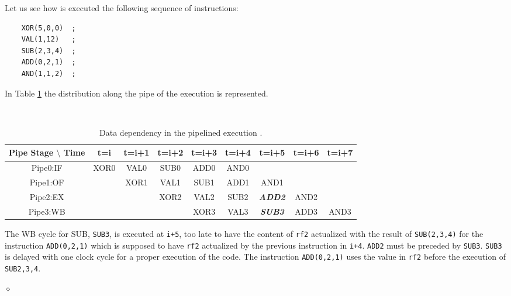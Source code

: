 \begin{exemplu}\label{dataDep}
Let us see how is executed the following sequence of instructions:
\begin{verbatim}
    XOR(5,0,0)  ;
    VAL(1,12)   ;
    SUB(2,3,4)  ;
    ADD(0,2,1)  ;
    AND(1,1,2)  ;
\end{verbatim}
In Table \ref{pipeEx2} the distribution along the pipe of the execution is represented.

\begin{table}[H]
  \begin{center}
    \caption{Data dependency in the pipelined execution .}
    \label{pipeEx2}
    {\small
    {\tt
    \begin{tabular}{|c||c|c|c|c|c|c|c|c|}
      \hline
     Pipe Stage $\setminus$ Time  & t=i   & t=i+1 & t=i+2 & t=i+3  & t=i+4  & t=i+5  & t=i+6 & t=i+7    \\ \hline \hline
        Pipe0:IF                  & XOR0  & VAL0  & SUB0  & ADD0  & AND0   &        &        &                \\ \hline
        Pipe1:OF                  &       & XOR1  & VAL1  & SUB1  & ADD1   & AND1   &        &                 \\ \hline
        Pipe2:EX                  &       &       & XOR2  & VAL2  & SUB2   & {\footnotesize {\bf {\em ADD2}}}   & AND2   &                 \\ \hline
        Pipe3:WB                  &       &       &       & XOR3  & VAL3   & {\footnotesize {\bf {\em SUB3}}}   & ADD3   & AND3              \\ \hline
    \end{tabular}
    }
    }
  \end{center}
\end{table}
The WB cycle for SUB, {\tt SUB3}, is executed at {\tt i+5}, too late to have the content of {\tt rf2} actualized with the result of  {\tt SUB(2,3,4)} for the instruction {\tt ADD(0,2,1)} which is supposed to have {\tt rf2} actualized by the previous instruction in {\tt i+4}. {\tt ADD2} must be preceded by {\tt SUB3}. {\tt SUB3} is delayed with one clock cycle for a proper execution of the code. The instruction {\tt ADD(0,2,1)} uses the value in {\tt rf2} before the execution of {\tt SUB{2,3,4}}.

$\diamond$
\end{exemplu}



